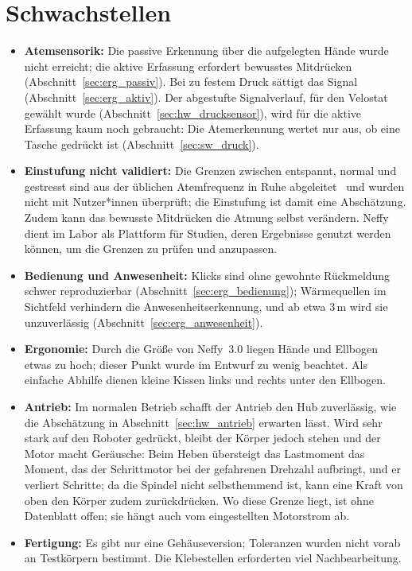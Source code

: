 \section{Schwachstellen}
\label{sec:schwachstellen}

\begin{itemize}
  \item \textbf{Atemsensorik:} Die passive Erkennung über die aufgelegten Hände wurde nicht
        erreicht; die aktive Erfassung erfordert bewusstes Mitdrücken
        (Abschnitt~\ref{sec:erg_passiv}). Bei zu festem Druck sättigt das Signal
        (Abschnitt~\ref{sec:erg_aktiv}). Der abgestufte Signalverlauf, für den Velostat gewählt
        wurde (Abschnitt~\ref{sec:hw_drucksensor}), wird für die aktive Erfassung kaum noch
        gebraucht: Die Atemerkennung wertet nur aus, ob eine Tasche gedrückt ist
        (Abschnitt~\ref{sec:sw_druck}).
  \item \textbf{Einstufung nicht validiert:} Die Grenzen zwischen entspannt, normal und gestresst
        sind aus der üblichen Atemfrequenz in Ruhe abgeleitet~\cite{nicolo2020rr} und wurden nicht
        mit Nutzer*innen überprüft; die Einstufung ist damit eine Abschätzung. Zudem kann das
        bewusste Mitdrücken die Atmung selbst verändern. Neffy dient im Labor als Plattform für
        Studien, deren Ergebnisse genutzt werden können, um die Grenzen zu prüfen und anzupassen.
  \item \textbf{Bedienung und Anwesenheit:} Klicks sind ohne gewohnte Rückmeldung schwer
        reproduzierbar (Abschnitt~\ref{sec:erg_bedienung}); Wärmequellen im Sichtfeld verhindern
        die Anwesenheitserkennung, und ab etwa 3\,m wird sie unzuverlässig
        (Abschnitt~\ref{sec:erg_anwesenheit}).
  \item \textbf{Ergonomie:} Durch die Größe von Neffy~3.0 liegen Hände und Ellbogen etwas zu hoch;
        dieser Punkt wurde im Entwurf zu wenig beachtet. Als einfache Abhilfe dienen kleine Kissen
        links und rechts unter den Ellbogen.
  \item \textbf{Antrieb:} Im normalen Betrieb schafft der Antrieb den Hub zuverlässig, wie die
        Abschätzung in Abschnitt~\ref{sec:hw_antrieb} erwarten lässt. Wird sehr stark auf den
        Roboter gedrückt, bleibt der Körper jedoch stehen und der Motor macht Geräusche: Beim
        Heben übersteigt das Lastmoment das Moment, das der Schrittmotor bei der gefahrenen
        Drehzahl aufbringt, und er verliert Schritte; da die Spindel nicht selbsthemmend ist, kann
        eine Kraft von oben den Körper zudem zurückdrücken. Wo diese Grenze liegt, ist ohne
        Datenblatt offen; sie hängt auch vom eingestellten Motorstrom ab.
  \item \textbf{Fertigung:} Es gibt nur eine Gehäuseversion; Toleranzen wurden nicht vorab an
        Testkörpern bestimmt. Die Klebestellen erforderten viel Nachbearbeitung.
\end{itemize}

